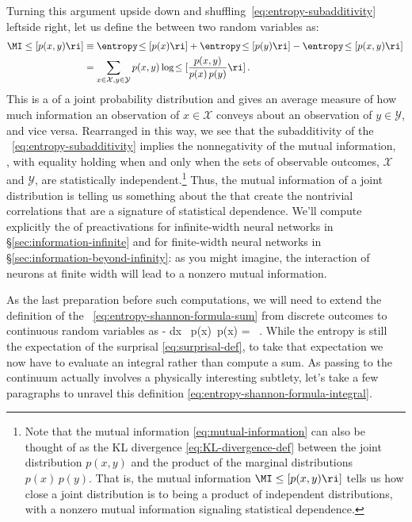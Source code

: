 Turning this argument upside down and shuffling~\eqref{eq:entropy-subadditivity} leftside right, let us define the  between two random variables as:
\begin{align}\label{eq:mutual-information}
\MI\le[p(x,y)\ri] &\equiv \entropy\!\le[p(x)\ri] +\entropy\!\le[p(y)\ri]-\entropy\!\le[p(x,y)\ri]\, \\
&= \sum_{x \in \mathcal{X}, y \in \mathcal{Y}} p(x,y) \log \!\le[ \frac{p(x,y)}{p(x)\, p(y)} \ri] \, . \notag
\end{align}
This is a  of a joint probability distribution and gives an average measure of how much information an observation of $x\in\mathcal{X}$ conveys about an observation of $y\in\mathcal{Y}$, and vice versa.
Rearranged in this way, we see that the subadditivity of the ~\eqref{eq:entropy-subadditivity} implies the nonnegativity of the mutual information,
\be\label{eq:positivity-of-mutual-information}
\MI\le[p(x,y)\ri]   \, ,
\ee
with equality holding when and only when the sets of observable outcomes, $\mathcal{X}$ and $\mathcal{Y}$, are statistically independent.\footnote{Note that the mutual information \eqref{eq:mutual-information} can also be thought of as the KL divergence \eqref{eq:KL-divergence-def} between the joint distribution $p(x,y)$ and the product of the marginal distributions $p(x)\,p(y)$.
That is, the mutual information $\MI\le[p(x,y)\ri]$ tells us how close a joint distribution is to being a product of independent distributions, with a nonzero mutual information signaling statistical dependence.
}
Thus, the mutual information of a joint distribution is telling us something about the  that create the nontrivial correlations that are a signature of statistical dependence.
We'll compute explicitly the  of preactivations for infinite-width neural networks in \S\ref{sec:information-infinite} and for finite-width neural networks in \S\ref{sec:information-beyond-infinity}: as you might imagine, 
the 
interaction of neurons at finite width will lead to a nonzero mutual information. 

As the last preparation before such computations,  we will need to extend the definition of the ~\eqref{eq:entropy-shannon-formula-sum} from discrete outcomes to continuous random variables as
\be\label{eq:entropy-shannon-formula-integral}
\entropy\!\le[ p(x)\ri] \equiv - \int \!dx \ p(x)\, \log p(x)  =  \, .
\ee
While the entropy is still the expectation of the surprisal \eqref{eq:surprisal-def}, to take that expectation we now have to evaluate an integral rather than compute a sum.
As passing to the continuum actually involves a physically interesting subtlety, let's take a few paragraphs to unravel this definition \eqref{eq:entropy-shannon-formula-integral}.


